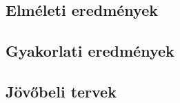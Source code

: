 \chapter{\osszefoglalas}

\section{Elméleti eredmények}

\section{Gyakorlati eredmények}

\section{Jövőbeli tervek}

